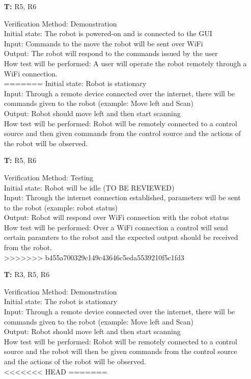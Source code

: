 \documentclass[12pt, titlepage]{article}
\newcounter{tnum} %
\begin{document}
\begin{itemize}
\item[\textbf{T\refstepcounter{tnum}\thetnum:}]{R5, R6\\}

Verification Method: Demonstration	\\
Initial state: The robot is powered-on and is connected to the GUI \\
Input: Commands to the move the robot will be sent over WiFi \\
Output: The robot will respond to the commands issued by the user  \\
How test will be performed: A user will operate the robot remotely through a WiFi connection.\\
=======
Initial state: Robot is stationary \\
Input: Through a remote device connected over the internet, there will be commands given to the robot (example: Move left and Scan) \\
Output: Robot should move left and then start scanning  \\
How test will be performed: Robot will be remotely connected to a control source and then given commands from the control source and the actions of the robot will be observed. \\

\item[\textbf{T\refstepcounter{tnum}\thetnum:}]{R5, R6\\}

Verification Method: Testing	\\
Initial state: Robot will be idle (TO BE REVIEWED) \\
Input: Through the internet connection established, parameters will be sent to the robot (example: robot status) \\
Output: Robot will respond over WiFi connection with the robot status  \\
How test will be performed: Over a WiFi connection a control will send certain paramters to the robot and the expected output should be received from the robot. \\
>>>>>>> b455a700329c149c43646c5eda5539210f5c1fd3

\item[\textbf{T\refstepcounter{tnum}\thetnum:}]{R3, R5, R6\\}

Verification Method: Demonstration\\
Initial state: The robot is stationary \\
Input: Through a remote device connected over the internet, there will be commands given to the robot (example: Move left and Scan) \\
Output: Robot should move left and then start scanning  \\
How test will be performed: Robot will be remotely connected to a control source and the robot will then be given commands from the control source and the actions of the robot will be observed. \\
<<<<<<< HEAD
=======


\end{itemize}
\end{document}

